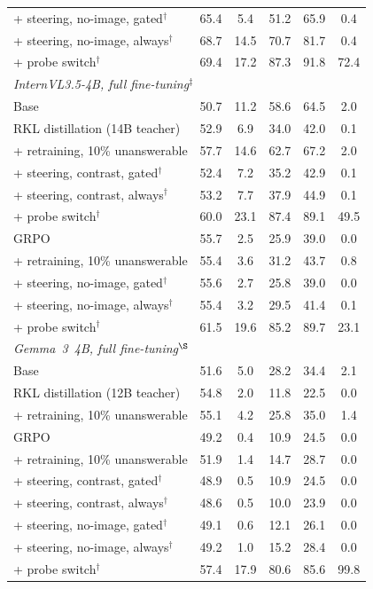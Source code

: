 \documentclass[10pt,twocolumn,letterpaper]{article}
\begin{document}
\begin{table}[t]
\begin{tabular}{lccccc}
\quad + steering, no-image, gated$^\dagger$  & 65.4 &  5.4 & 51.2 & 65.9 &  0.4 \\
\quad + steering, no-image, always$^\dagger$ & 68.7 & 14.5 & 70.7 & 81.7 &  0.4 \\
\quad + probe switch$^\dagger$               & 69.4 & 17.2 & 87.3 & 91.8 & 72.4 \\
\midrule
\multicolumn{6}{l}{\textit{InternVL3.5-4B, full fine-tuning$^\ddagger$}} \\
Base                                         & 50.7 & 11.2 & 58.6 & 64.5 &  2.0 \\
RKL distillation (14B teacher)               & 52.9 &  6.9 & 34.0 & 42.0 &  0.1 \\
\quad + retraining, 10\% unanswerable        & 57.7 & 14.6 & 62.7 & 67.2 &  2.0 \\
\quad + steering, contrast, gated$^\dagger$  & 52.4 &  7.2 & 35.2 & 42.9 &  0.1 \\
\quad + steering, contrast, always$^\dagger$ & 53.2 &  7.7 & 37.9 & 44.9 &  0.1 \\
\quad + probe switch$^\dagger$               & 60.0 & 23.1 & 87.4 & 89.1 & 49.5 \\
GRPO                                         & 55.7 &  2.5 & 25.9 & 39.0 &  0.0 \\
\quad + retraining, 10\% unanswerable        & 55.4 &  3.6 & 31.2 & 43.7 &  0.8 \\
\quad + steering, no-image, gated$^\dagger$  & 55.6 &  2.7 & 25.8 & 39.0 &  0.0 \\
\quad + steering, no-image, always$^\dagger$ & 55.4 &  3.2 & 29.5 & 41.4 &  0.1 \\
\quad + probe switch$^\dagger$               & 61.5 & 19.6 & 85.2 & 89.7 & 23.1 \\
\midrule
\multicolumn{6}{l}{\textit{Gemma~3~4B, full fine-tuning$^\S$}} \\
Base                                         & 51.6 &  5.0 & 28.2 & 34.4 &  2.1 \\
RKL distillation (12B teacher)               & 54.8 &  2.0 & 11.8 & 22.5 &  0.0 \\
\quad + retraining, 10\% unanswerable        & 55.1 &  4.2 & 25.8 & 35.0 &  1.4 \\
GRPO                                         & 49.2 &  0.4 & 10.9 & 24.5 &  0.0 \\
\quad + retraining, 10\% unanswerable        & 51.9 &  1.4 & 14.7 & 28.7 &  0.0 \\
\quad + steering, contrast, gated$^\dagger$  & 48.9 &  0.5 & 10.9 & 24.5 &  0.0 \\
\quad + steering, contrast, always$^\dagger$ & 48.6 &  0.5 & 10.0 & 23.9 &  0.0 \\
\quad + steering, no-image, gated$^\dagger$  & 49.1 &  0.6 & 12.1 & 26.1 &  0.0 \\
\quad + steering, no-image, always$^\dagger$ & 49.2 &  1.0 & 15.2 & 28.4 &  0.0 \\
\quad + probe switch$^\dagger$               & 57.4 & 17.9 & 80.6 & 85.6 & 99.8 \\
\bottomrule
\end{tabular}



\end{table}
\end{document}
